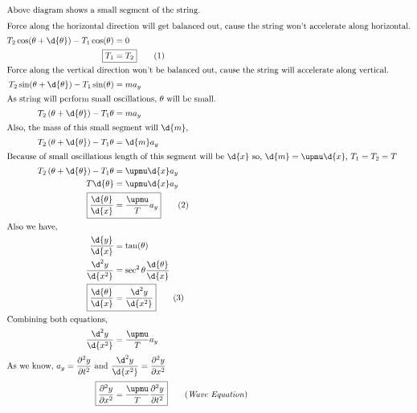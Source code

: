     \begin{align*}
        \intertext{Above diagram shows a small segment of the string.}
        \intertext{Force along the horizontal direction will get balanced out, cause the string won't accelerate along horizontal.}
        T_2\cos(\theta+\d{\theta}) - T_1\cos(\theta) &= 0\\
        \Aboxed{T_1 &= T_2} \tag{1}\\
        \intertext{Force along the vertical direction won't be balanced out, cause the string will accelerate along vertical.}
        T_2\sin(\theta+\d{\theta}) - T_1\sin(\theta) &= m a_y\\
        \intertext{As string will perform small oscillations, $\theta$ will be small.}
        T_2\left(\theta + \d{\theta}\right) - T_1\theta &= m a_y\\
        \intertext{Also, the mass of this small segment will $\d{m}$,}
        T_2\left(\theta + \d{\theta}\right) - T_1\theta &= \d{m} a_y\\
        \intertext{Because of small oscillations length of this segment will be $\d{x}$ so, $\d{m} = \upmu \d{x}$, $T_1=T_2=T$}
        T_2\left(\theta + \d{\theta}\right) - T_1\theta &= \upmu \d{x} a_y\\
        T\d{\theta} &= \upmu \d{x} a_y\\
        \Aboxed{\dfrac{\d{\theta}}{\d{x}} &= \dfrac{\upmu}{T} a_y } \tag{2}\\
        \intertext{Also we have,}
        \dfrac{\d{y}}{\d{x}} &= \tan(\theta)\\
        \dfrac{\d^2{y}}{\d{x^2}} &= \sec^2\theta\dfrac{\d{\theta}}{\d{x}}\\
        \Aboxed{\dfrac{\d{\theta}}{\d{x}} &= \dfrac{\d^2{y}}{\d{x^2}}} \tag{3}\\
        \intertext{Combining both equations,}
        \dfrac{\d^2{y}}{\d{x^2}} &= \dfrac{\upmu}{T} a_y\\
        \intertext{As we know, $a_y = \dfrac{\partial^2{y}}{\partial{t^2}}$ and $\dfrac{\d^2{y}}{\d{x^2}}=\dfrac{\partial^2{y}}{\partial{x^2}}$}
        \Aboxed{\dfrac{\partial^2{y}}{\partial{x^2}} &= \dfrac{\upmu}{T} \dfrac{\partial^2{y}}{\partial{t^2}}} \tag{\textit{Wave Equation}}
    \end{align*}

